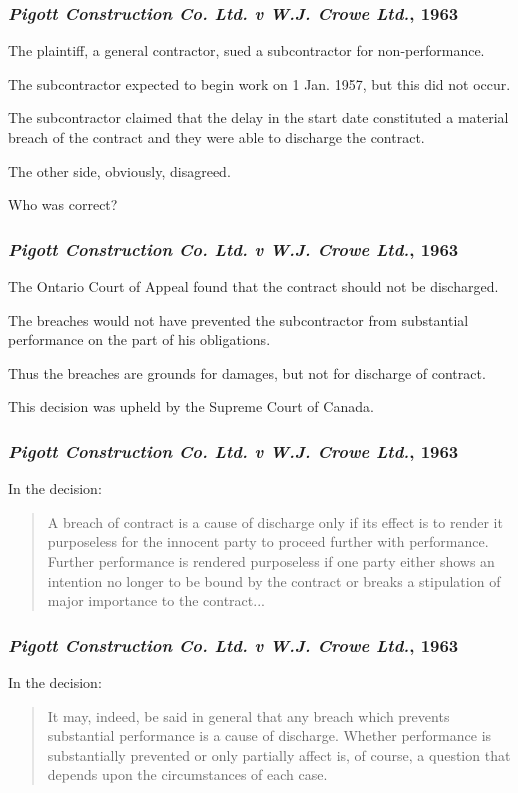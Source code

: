 \begin{frame}
\frametitle{\textit{Pigott Construction Co. Ltd. v W.J. Crowe Ltd.}, 1963 }

The plaintiff, a general contractor, sued a subcontractor for non-performance.

The subcontractor expected to begin work on 1 Jan. 1957, but this did not occur.

The subcontractor claimed that the delay in the start date constituted a material breach of the contract and they were able to discharge the contract.

The other side, obviously, disagreed.

Who was correct?

\end{frame}



\begin{frame}
\frametitle{\textit{Pigott Construction Co. Ltd. v W.J. Crowe Ltd.}, 1963 }

The Ontario Court of Appeal found that the contract should not be discharged.

The breaches would not have prevented the subcontractor from substantial performance on the part of his obligations.

Thus the breaches are grounds for damages, but not for discharge of contract.

This decision was upheld by the Supreme Court of Canada.

\end{frame}



\begin{frame}
\frametitle{\textit{Pigott Construction Co. Ltd. v W.J. Crowe Ltd.}, 1963 }

In the decision:

\begin{quote}
A breach of contract is a cause of discharge only if its effect is to render it purposeless for the innocent party to proceed further with performance.  Further performance is rendered purposeless if one party either shows an intention no longer to be bound by the contract or breaks a stipulation of major importance to the contract...
\end{quote}

\end{frame}

\begin{frame}
\frametitle{\textit{Pigott Construction Co. Ltd. v W.J. Crowe Ltd.}, 1963 }

In the decision:

\begin{quote}
It may, indeed, be said in general that any breach which prevents substantial performance is a cause of discharge.  Whether performance is substantially prevented or only partially affect is, of course, a question that depends upon the circumstances of each case.\end{quote}


\end{frame}



